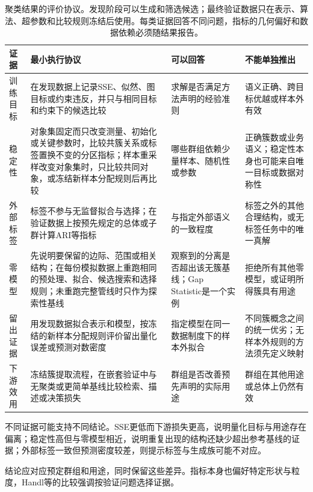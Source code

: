 \begin{table}[htbp]
  \centering
  \small
  \begin{tabularx}{\linewidth}{@{}>{\RaggedRight\arraybackslash}p{21mm}>{\RaggedRight\arraybackslash}p{43mm}>{\RaggedRight\arraybackslash}X>{\RaggedRight\arraybackslash}X@{}}
    \toprule
    证据 & 最小执行协议 & 可以回答 & 不能单独推出 \\
    \midrule
    训练目标 & 在发现数据上记录SSE、似然、图目标或约束违反，并只与相同目标和约束下的候选比较 & 求解是否满足方法声明的经验准则 & 语义正确、跨目标优越或样本外有效 \\
    稳定性 & 对象集固定而只改变测量、初始化或关键参数时，比较共簇关系或标签置换不变的分区指标；样本重采样改变对象集时，只比较共同对象，或冻结新样本分配规则后再比较 & 哪些群组依赖少量样本、随机性或参数 & 正确簇数或业务语义；稳定性本身也可能来自唯一目标或数据对称性 \\
    外部标签 & 标签不参与无监督拟合与选择；在验证数据上按预先规定的总体或子群计算ARI等指标 & 与指定外部语义的一致程度 & 标签之外的其他合理结构，或无标签任务中的唯一真解 \\
    零模型 & 先说明要保留的边际、范围或相关结构；在每份模拟数据上重跑相同的预处理、拟合、候选搜索和选择规则；未重跑完整管线时只作为探索性基线 & 观察到的分离是否超出该无簇基线；Gap Statistic是一个实例 & 拒绝所有其他零模型，或证明所得簇具有用途 \\
    留出证据 & 用发现数据拟合表示和模型，按冻结的新样本分配规则评价留出量化误差或预测对数密度 & 指定模型在同一数据制度下的样本外拟合 & 不同簇概念之间的统一优劣；无样本外规则的方法须先定义映射 \\
    下游效用 & 冻结簇提取流程，在嵌套验证中与无聚类或更简单基线比较检索、描述或决策损失 & 群组是否改善预先声明的实际用途 & 群组在其他用途或总体上仍然有效 \\
    \bottomrule
  \end{tabularx}
  \caption{聚类结果的评价协议。发现阶段可以生成和筛选候选；最终验证数据只在表示、算法、超参数和比较规则冻结后使用。每类证据回答不同问题，指标的几何偏好和数据依赖必须随结果报告。}
  \label{tab:clustering-evaluation-protocol}
\end{table}

不同证据可能支持不同结论。SSE更低而下游损失更高，说明量化目标与用途存在偏离；稳定性高但与零模型相近，说明重复出现的结构还缺少超出参考基线的证据；外部标签一致但预测密度较差，则提示标签与生成族可能不对应。

结论应对应预定群组和用途，同时保留这些差异。指标本身也偏好特定形状与粒度，Handl等的比较强调按验证问题选择证据。


